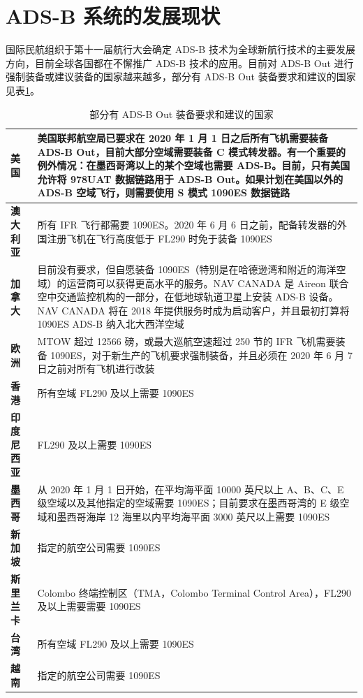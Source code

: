 \section{ADS-B 系统的发展现状}

国际民航组织于第十一届航行大会确定 ADS-B 技术为全球新航行技术的主要发展方向，目前全球各国都在不懈推广 ADS-B 技术的应用。目前对 ADS-B Out 进行强制装备或建议装备的国家越来越多，部分有 ADS-B Out 装备要求和建议的国家见表\ref{tab:Countries_with_ADS-B_Out_mandates_and_proposals}。

\renewcommand\arraystretch{1.5}
\begin{table}[!htb]
\centering
\caption{部分有 ADS-B Out 装备要求和建议的国家\protect\footnotemark}
\label{tab:Countries_with_ADS-B_Out_mandates_and_proposals}
\begin{tabular}[b]{|p{2cm}<{\raggedleft}|p{13cm}<{\raggedright}|}
\hline
\textbf{美国} & 美国联邦航空局已要求在 2020 年 1 月 1 日之后所有飞机需要装备 ADS-B Out，目前大部分空域需要装备 C 模式转发器。有一个重要的例外情况：在墨西哥湾以上的某个空域也需要 ADS-B。目前，只有美国允许将 978UAT 数据链路用于 ADS-B Out。如果计划在美国以外的 ADS-B 空域飞行，则需要使用 S 模式 1090ES 数据链路 \\
\hline
\textbf{澳大利亚} & 所有 IFR 飞行都需要 1090ES。2020 年 6 月 6 日之前，配备转发器的外国注册飞机在飞行高度低于 FL290 时免于装备 1090ES \\
\hline
\textbf{加拿大} & 目前没有要求，但自愿装备 1090ES（特别是在哈德逊湾和附近的海洋空域）的运营商可以获得更高水平的服务。NAV CANADA 是 Aireon 联合空中交通监控机构的一部分，在低地球轨道卫星上安装 ADS-B 设备。NAV CANADA 将在 2018 年提供服务时成为启动客户，并且最初打算将 1090ES ADS-B 纳入北大西洋空域 \\
\hline
\textbf{欧洲} & MTOW 超过 12566 磅，或最大巡航空速超过 250 节的 IFR 飞机需要装备 1090ES，对于新生产的飞机要求强制装备，并且必须在 2020 年 6 月 7 日之前对所有飞机进行改装 \\
\hline
\textbf{香港} & 所有空域 FL290 及以上需要 1090ES \\
\hline
\textbf{印度尼西亚} & FL290 及以上需要 1090ES \\
\hline
\textbf{墨西哥} & 从 2020 年 1 月 1 日开始，在平均海平面 10000 英尺以上 A、B、C、E 级空域以及其他指定的空域需要 1090ES；目前要求在墨西哥湾的 E 级空域和墨西哥海岸 12 海里以内平均海平面 3000 英尺以上需要 1090ES \\
\hline
\textbf{新加坡} & 指定的航空公司需要 1090ES \\
\hline
\textbf{斯里兰卡} & Colombo 终端控制区（TMA，Colombo Terminal Control Area），FL290 及以上需要需要 1090ES \\
\hline
\textbf{台湾} & 所有空域 FL290 及以上需要 1090ES \\
\hline
\textbf{越南} & 指定的航空公司需要 1090ES \\
\hline
\end{tabular}
\end{table}

